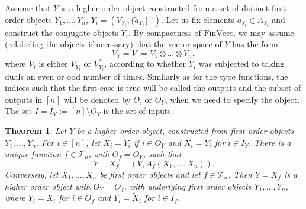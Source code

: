 \documentclass[12pt]{article}
\newtheorem{theorem}{Theorem}
\theoremstyle{definition}
\theoremstyle{remark}
\def\Te{\mathcal T}
\def \FV{\mathrm{FinVect}}
\begin{document}
  

Assume that  $Y$ is a higher order object constructed from a set of distinct first
order objects $Y_1,\dots, Y_n$, $Y_i=(V_{Y_i},\{\tilde a_{Y_i}\}^\sim)$.
Let us fix elements $a_{Y_i}\in A_{Y_i}$ and construct the conjugate objects $\tilde Y_i$. 
By compactness of $\FV$, we may assume (relabeling the objects if necessary) that the vector space of $Y$ has the form
\[
V_Y=V:=V_{1}\otimes \dots\otimes V_{n},
\]
where  $V_i$ is either $V_{Y_i}$ or $V_{Y_i}^*$, according to whether $Y_i$ was subjected
to taking duals an even or odd number of times. Similarly as for the type functions, the indices such that the first
case is true will be called the  outputs and the subset of outputs in $[n]$ will be denoted
by $O$, or $O_Y$, when we need to specify the object. The set $I=I_Y:=[n]\setminus O_Y$ is
the set of  inputs. 

\begin{theorem}\label{thm:boolean} Let $Y$ be a higher order object, constructed from first
order objects $Y_1,\dots,Y_n$. For $i\in [n]$, let 
$X_i=Y_i$ if $i\in O_Y$ and $X_i=\tilde Y_i$ for $i\in I_Y$. 
There is a unique function $f\in \Te_n$, with $O_f=O_Y$,  such that 
\[
Y= X_f=(V, A_f(X_1,\dots,X_n)).
\]
Conversely, let $X_1,\dots, X_n$  be first order objects  and let
$f\in \Te_n$. Then $Y=X_f$ is a higher order object with $O_Y=O_f$, with underlying first
order objects $Y_1,\dots, Y_n$, where $Y_i=X_i$ for $i\in O_f$ and $Y_i=\tilde X_i$ for
$i\in I_f$.  

\end{theorem}
\end{document}
